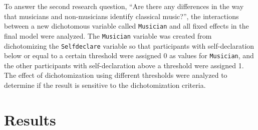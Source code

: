 \documentclass{article}
\begin{document}
To answer the second research question, ``Are there any differences in the way that musicians and non-musicians identify classical music?'', the interactions between a new dichotomous variable called \texttt{Musician} and all fixed effects in the final model were analyzed. The \texttt{Musician} variable was created from dichotomizing the \texttt{Selfdeclare} variable so that participants with self-declaration below or equal to a certain threshold were assigned 0 as values for \texttt{Musician}, and the other participants with self-declaration above a threshold were assigned 1. The effect of dichotomization using different thresholds were analyzed to determine if the result is sensitive to the dichotomization criteria.

\section{Results}



\end{document}
